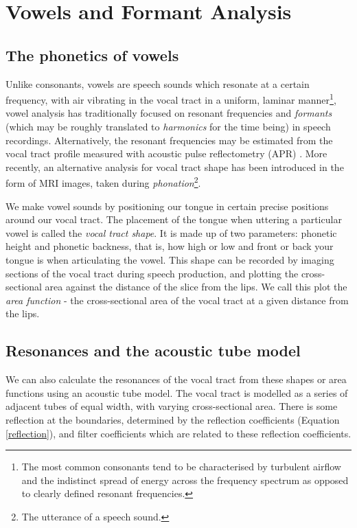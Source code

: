 \section{Vowels and Formant Analysis}

\subsection{The phonetics of vowels}

Unlike consonants, vowels are speech sounds which resonate at a certain frequency, with air vibrating in the vocal tract in a uniform, laminar manner\footnote{The most common consonants tend to be characterised by turbulent airflow and the indistinct spread of energy across the frequency spectrum as opposed to clearly defined resonant frequencies.}, vowel analysis has traditionally focused on resonant frequencies and \textit{formants} (which may be roughly translated to \textit{harmonics} for the time being) in speech recordings. Alternatively, the resonant frequencies may be estimated from the vocal tract profile measured with acoustic pulse reflectometry (APR) \cite{gray2005}. More recently, an alternative analysis for vocal tract shape has been introduced in the form of MRI images, taken during \textit{phonation}\footnote{The utterance of a speech sound.}.

We make vowel sounds by positioning our tongue in certain precise positions around our vocal tract. The placement of the tongue when uttering a particular vowel is called the \textit{vocal tract shape}. It is made up of two parameters: phonetic height and phonetic backness, that is, how high or low and front or back your tongue is when articulating the vowel. This shape can be recorded by imaging sections of the vocal tract during speech production, and plotting the cross-sectional area against the distance of the slice from the lips. We call this plot the \textit{area function} - the cross-sectional area of the vocal tract at a given distance from the lips.

\subsection{Resonances and the acoustic tube model}

We can also calculate the resonances of the vocal tract from these shapes or area functions using an acoustic tube model. The vocal tract is modelled as a series of adjacent tubes of equal width, with varying cross-sectional area. There is some reflection at the boundaries, determined by the reflection coefficients (Equation \ref{reflection}), and filter coefficients which are related to these reflection coefficients.

